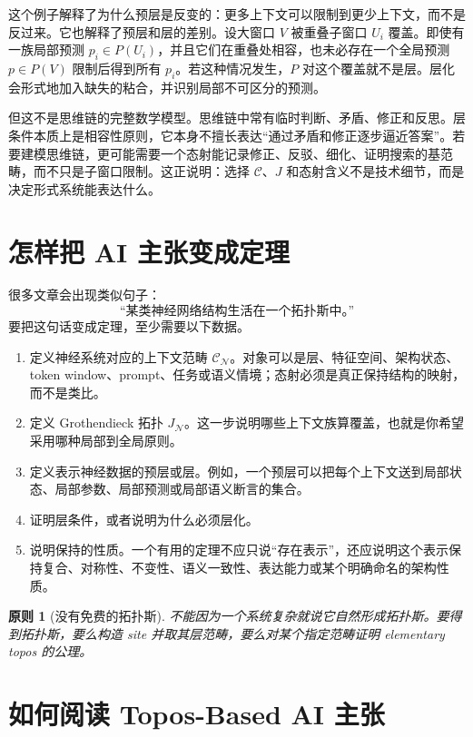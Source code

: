 \documentclass[UTF8,11pt,fontset=none]{ctexart}
\newtheorem{principle}[definition]{原则}
\begin{document}
这个例子解释了为什么预层是反变的：更多上下文可以限制到更少上下文，而不是反过来。它也解释了预层和层的差别。设大窗口 \(V\) 被重叠子窗口 \(U_i\) 覆盖。即使有一族局部预测 \(p_i\in P(U_i)\)，并且它们在重叠处相容，也未必存在一个全局预测 \(p\in P(V)\) 限制后得到所有 \(p_i\)。若这种情况发生，\(P\) 对这个覆盖就不是层。层化会形式地加入缺失的粘合，并识别局部不可区分的预测。

但这不是思维链的完整数学模型。思维链中常有临时判断、矛盾、修正和反思。层条件本质上是相容性原则，它本身不擅长表达“通过矛盾和修正逐步逼近答案”。若要建模思维链，更可能需要一个态射能记录修正、反驳、细化、证明搜索的基范畴，而不只是子窗口限制。这正说明：选择 \(\mathcal C\)、\(J\) 和态射含义不是技术细节，而是决定形式系统能表达什么。

\section{怎样把 AI 主张变成定理}

很多文章会出现类似句子：
\[
\text{“某类神经网络结构生活在一个拓扑斯中。”}
\]
要把这句话变成定理，至少需要以下数据。

\begin{enumerate}
\item 定义神经系统对应的上下文范畴 \(\mathcal C_{\mathcal N}\)。对象可以是层、特征空间、架构状态、token window、prompt、任务或语义情境；态射必须是真正保持结构的映射，而不是类比。
\item 定义 Grothendieck 拓扑 \(J_{\mathcal N}\)。这一步说明哪些上下文族算覆盖，也就是你希望采用哪种局部到全局原则。
\item 定义表示神经数据的预层或层。例如，一个预层可以把每个上下文送到局部状态、局部参数、局部预测或局部语义断言的集合。
\item 证明层条件，或者说明为什么必须层化。
\item 说明保持的性质。一个有用的定理不应只说“存在表示”，还应说明这个表示保持复合、对称性、不变性、语义一致性、表达能力或某个明确命名的架构性质。
\end{enumerate}

\begin{principle}[没有免费的拓扑斯]
不能因为一个系统复杂就说它自然形成拓扑斯。要得到拓扑斯，要么构造 site 并取其层范畴，要么对某个指定范畴证明 elementary topos 的公理。
\end{principle}

\section{如何阅读 Topos-Based AI 主张}
\end{document}
